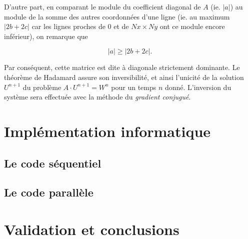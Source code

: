\documentclass[11pt]{article}
\begin{document}
\vspace{5 mm}

\noindent
D'autre part, en comparant le module du coefficient diagonal de $A$ (ie. $|a|$) au module de la somme des autres coordonnées d'une ligne (ie. au maximum $|2b+2c|$ car les lignes proches de 0 et de $Nx \times Ny$ ont ce module encore inférieur), on remarque que

$$|a| \geq |2b+2c|.$$

\noindent
Par conséquent, cette matrice est dite à diagonale strictement dominante. Le théorème de Hadamard assure son inversibilité, et ainsi l'unicité de la solution $U^{n+1}$ du problème $A \cdot U^{n+1} = W^n$ pour un temps $n$ donné. L'inversion du système sera effectuée avec la méthode du \textit{gradient conjugué}.



\newpage

\section{Implémentation informatique}

\subsection{Le code séquentiel}









\subsection{Le code parallèle}









\vspace{10 mm}

\section{Validation et conclusions}
\end{document}
